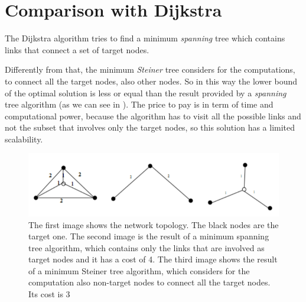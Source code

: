 \section{Comparison with Dijkstra}\label{sec:comparison}

The Dijkstra algorithm tries to find a minimum \emph{spanning} tree which
contains links that connect a set of target nodes.

Differently from that, the minimum \emph{Steiner} tree considers for the
computations, to connect all the target nodes, also other nodes. So in this way
the lower bound of the optimal solution is less or equal than the result
provided by a \emph{spanning} tree algorithm (as we can see in
). The price to pay is in term of time and computational
power, because the algorithm has to visit all the possible links and not the
subset that involves only the target nodes, so this solution has a limited
scalability.

\begin{figure}
\includegraphics{img/steiner.png}
\caption{The first image shows the network topology. The black nodes are the
	target one. The second image is the result of a minimum spanning tree
	algorithm, which contains only the links that are involved as target
	nodes and it has a cost of 4. The third image shows the result of a
	minimum Steiner tree algorithm, which considers for the computation also
	non-target nodes to connect all the target nodes. Its cost is
	3}\label{fig:steiner}
\end{figure}

